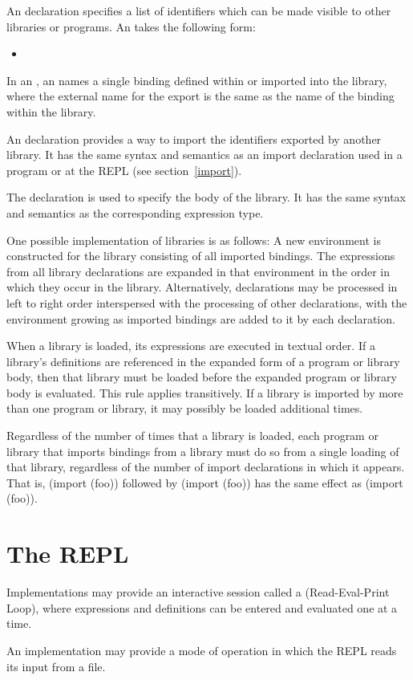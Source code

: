 An  declaration specifies a list of identifiers which
can be made visible to other libraries or programs.
An  takes the following form:

\begin{itemize}
\item{}
\end{itemize}

In an , an  names a single
binding defined within or imported into the library, where the
external name for the export is the same as the name of the binding
within the library.

An  declaration provides a way to import the identifiers
exported by another library.  It has the same syntax and semantics as
an import declaration used in a program or at the REPL (see section~\ref{import}).

The  declaration is
used to specify the body of
the library.  It has the same syntax and semantics as the corresponding
expression type.

One possible implementation of libraries is as follows:
A new
environment is constructed for the library consisting of all
imported bindings.  The expressions
from all 
library declarations are expanded in that environment in the order in which
they occur in the library.
Alternatively,  declarations may be processed
in left to right order interspersed with the processing of other
declarations, with the environment growing as imported bindings are
added to it by each  declaration.

When a library is loaded, its expressions are executed
in textual order.
If a library's definitions are referenced in the expanded form of a
program or library body, then that library must be loaded before the
expanded program or library body is evaluated. This rule applies
transitively.  If a library is imported by more than one program or
library, it may possibly be loaded additional times.

Regardless of the number of times that a library is loaded, each
program or library that imports bindings from a library must do so from a
single loading of that library, regardless of the number of import
declarations in which it appears.
That is, {\cf (import (foo))} followed by {\cf (import (foo))}
has the same effect as {\cf (import (foo))}.

\section{The REPL}

Implementations may provide an interactive session called a
 (Read-Eval-Print Loop), where
expressions and definitions can be
entered and evaluated one at a time.

An implementation may provide a mode of operation in which the REPL
reads its input from a file.

